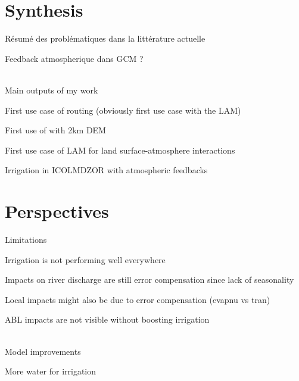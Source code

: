 \section{Synthesis}
Résumé des problématiques dans la littérature actuelle

Feedback atmospherique dans GCM ?

\hfill\\
Main outputs of my work

First use case of \native routing (obviously first use case with the LAM)

First use of \native with 2km DEM

First use case of LAM for land surface-atmosphere interactions

Irrigation in ICOLMDZOR with atmospheric feedbacks

\section{Perspectives}
Limitations

Irrigation is not performing well everywhere

Impacts on river discharge are still error compensation since lack of seasonality

Local impacts might also be due to error compensation (evapnu vs tran)

ABL impacts are not visible without boosting irrigation

\hfill\\
Model improvements

More water for irrigation



